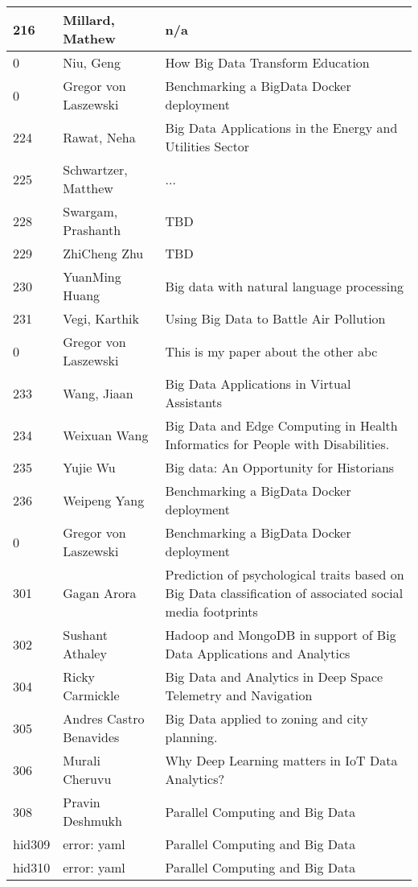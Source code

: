 \documentclass[12pt]{book}
\begin{document}
\begin{footnotesize}
\begin{longtable}{|p{1cm}p{5cm}p{9cm}|}
\hline
216 & Millard, Mathew & n/a  \\
\hline
0 & Niu, Geng & How Big Data Transform Education  \\
\hline
0 & Gregor von Laszewski & Benchmarking a BigData Docker deployment  \\
\hline
224 & Rawat, Neha & Big Data Applications in the Energy and Utilities Sector  \\
\hline
225 & Schwartzer, Matthew & ...  \\
\hline
228 & Swargam, Prashanth & TBD  \\
\hline
229 & ZhiCheng Zhu & TBD  \\
\hline
230 & YuanMing Huang & Big data with natural language processing  \\
\hline
231 & Vegi, Karthik & Using Big Data to Battle Air Pollution  \\
\hline
0 & Gregor von Laszewski & This is my paper about the other abc  \\
\hline
233 & Wang, Jiaan & Big Data Applications in Virtual Assistants  \\
\hline
234 & Weixuan Wang & Big Data and Edge Computing in Health Informatics for People with Disabilities.  \\
\hline
235 & Yujie Wu & Big data: An Opportunity for Historians  \\
\hline
236 & Weipeng Yang & Benchmarking a BigData Docker deployment  \\
\hline
0 & Gregor von Laszewski & Benchmarking a BigData Docker deployment  \\
\hline
301 & Gagan Arora & Prediction of psychological traits based on Big Data classification of associated social media footprints  \\
\hline
302 & Sushant Athaley & Hadoop and MongoDB in support of Big Data Applications and Analytics  \\
\hline
304 & Ricky Carmickle & Big Data and Analytics in Deep Space Telemetry and Navigation  \\
\hline
305 & Andres Castro Benavides & Big Data applied to zoning and city planning.  \\
\hline
306 & Murali Cheruvu & Why Deep Learning matters in IoT Data Analytics?  \\
\hline
308 & Pravin Deshmukh & Parallel Computing and Big Data  \\
\hline
hid309 & error: yaml & Parallel Computing and Big Data  \\
\hline
hid310 & error: yaml & Parallel Computing and Big Data  \\

\end{longtable}
\end{footnotesize}
\end{document}

